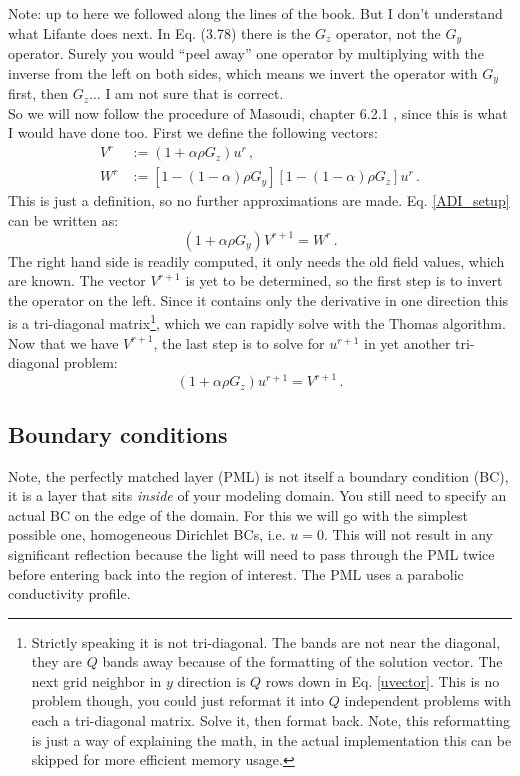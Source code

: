 \documentclass[]{article}
\begin{document}
	Note: up to here we followed along the lines of the book\cite{Lifante_2015}. But I don't understand what Lifante does next. In Eq. (3.78) there is the $G_z$ operator, not the $G_y$ operator. Surely you would ``peel away'' one operator by multiplying with the inverse from the left on both sides, which means we invert the operator with $G_y$ first, then $G_z$... I am not sure that is correct.\\
	
	So we will now follow the procedure of Masoudi, chapter 6.2.1 \cite{masoudi1995parallel}, since this is what I would have done too. First we define the following vectors:
	\begin{subequations}
		\begin{align}
			V^r &:= \left(1+\alpha \rho G_z \right) u^r\, ,\\
			W^r &:= \left[1-(1-\alpha)\rho G_y \right]\left[1-(1-\alpha)\rho G_z \right] u^r \, .
		\end{align}
	\end{subequations}
	This is just a definition, so no further approximations are made. Eq. \eqref{ADI_setup} can be written as:
	\begin{equation}
		\left(1+\alpha \rho G_y \right) V^{r+1} = W^r\, .
	\end{equation}
	The right hand side is readily computed, it only needs the old field values, which are known. The vector $V^{r+1}$ is yet to be determined, so the first step is to invert the operator on the left. Since it contains only the derivative in one direction this is a tri-diagonal matrix\footnote{Strictly speaking it is not tri-diagonal. The bands are not near the diagonal, they are $Q$ bands away because of the formatting of the solution vector. The next grid neighbor in $y$ direction is $Q$ rows down in Eq. \eqref{uvector}. This is no problem though, you could just reformat it into $Q$ independent problems with each a tri-diagonal matrix. Solve it, then format back. Note, this reformatting is just a way of explaining the math, in the actual implementation this can be skipped for more efficient memory usage.}, which we can rapidly solve with the Thomas algorithm. Now that we have $V^{r+1}$, the last step is to solve for $u^{r+1}$ in yet another tri-diagonal problem:
	\begin{equation}
		\left(1+\alpha \rho G_z \right) u^{r+1} = V^{r+1}\, .
	\end{equation}
	
	\subsection{Boundary conditions}
	\label{BC_section}	
	Note, the perfectly matched layer (PML) is not itself a boundary condition (BC), it is a layer that sits \textit{inside} of your modeling domain. You still need to specify an actual BC on the edge of the domain. For this we will go with the simplest possible one, homogeneous Dirichlet BCs, i.e. $u=0$. This will not result in any significant reflection because the light will need to pass through the PML twice before entering back into the region of interest. The PML uses a parabolic conductivity profile.\\
	
\end{document}
